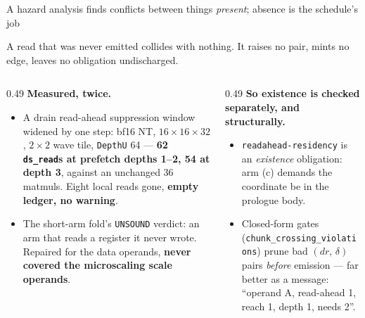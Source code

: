 \documentclass[aspectratio=169,9pt]{beamer}
\newcommand{\tsub}[1]{{\footnotesize\color{gray}#1}}
\newcommand{\key}[1]{\textcolor{acc}{\textbf{#1}}}
\newcommand{\bad}[1]{\textcolor{warn}{\textbf{#1}}}
\newcommand{\good}[1]{\textcolor{ok}{\textbf{#1}}}
\begin{document}
\begin{frame}{A hazard analysis finds conflicts between things \emph{present}; absence is the schedule's job}

\begin{center}

\vspace{2pt}
{\footnotesize A read that was never emitted collides with nothing. It raises no pair, mints no edge, leaves no obligation undischarged.}
\end{center}

\vspace{-2pt}
\begin{columns}[T]
\begin{column}{0.49\textwidth}
\bad{Measured, twice.}
\begin{itemize}\itemsep2pt
  \item A drain read-ahead suppression window widened by one step: bf16 NT, $16{\times}16{\times}32$, $2{\times}2$ wave tile, \texttt{DepthU} 64 --- \key{62 \texttt{ds\_read}s at prefetch depths 1--2, 54 at depth 3}, against an unchanged 36 matmuls. Eight local reads gone, \bad{empty ledger, no warning}.
  \item The short-arm fold's \texttt{UNSOUND} verdict: an arm that reads a register it never wrote. Repaired for the data operands, \bad{never covered the microscaling scale operands}.
\end{itemize}
\end{column}
\begin{column}{0.49\textwidth}
\good{So existence is checked separately, and structurally.}
\begin{itemize}\itemsep2pt
  \item \texttt{readahead-residency} is an \emph{existence} obligation: arm (c) demands the coordinate be in the prologue body.
  \item Closed-form gates (\texttt{chunk\_crossing\_violations}) prune bad $(dr,\,\delta)$ pairs \emph{before} emission --- far better as a message: ``operand A, read-ahead 1, reach 1, depth 1, needs 2''.
\end{itemize}
\end{column}
\end{columns}
\end{frame}
\end{document}

